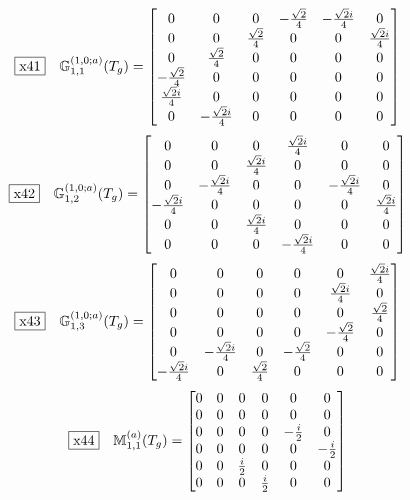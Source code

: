 \documentclass[fleqn,10pt,landscape]{jsarticle}
\begin{document}
\begin{dmath*}
\fbox{x41}\quad \mathbb{G}_{1,1}^{(1,0;a)}(T_{g})=\begin{bmatrix} 0 & 0 & 0 & - \frac{\sqrt{2}}{4} & - \frac{\sqrt{2} i}{4} & 0 \\ 0 & 0 & \frac{\sqrt{2}}{4} & 0 & 0 & \frac{\sqrt{2} i}{4} \\ 0 & \frac{\sqrt{2}}{4} & 0 & 0 & 0 & 0 \\ - \frac{\sqrt{2}}{4} & 0 & 0 & 0 & 0 & 0 \\ \frac{\sqrt{2} i}{4} & 0 & 0 & 0 & 0 & 0 \\ 0 & - \frac{\sqrt{2} i}{4} & 0 & 0 & 0 & 0 \end{bmatrix}
\end{dmath*}
\begin{dmath*}
\fbox{x42}\quad \mathbb{G}_{1,2}^{(1,0;a)}(T_{g})=\begin{bmatrix} 0 & 0 & 0 & \frac{\sqrt{2} i}{4} & 0 & 0 \\ 0 & 0 & \frac{\sqrt{2} i}{4} & 0 & 0 & 0 \\ 0 & - \frac{\sqrt{2} i}{4} & 0 & 0 & - \frac{\sqrt{2} i}{4} & 0 \\ - \frac{\sqrt{2} i}{4} & 0 & 0 & 0 & 0 & \frac{\sqrt{2} i}{4} \\ 0 & 0 & \frac{\sqrt{2} i}{4} & 0 & 0 & 0 \\ 0 & 0 & 0 & - \frac{\sqrt{2} i}{4} & 0 & 0 \end{bmatrix}
\end{dmath*}
\begin{dmath*}
\fbox{x43}\quad \mathbb{G}_{1,3}^{(1,0;a)}(T_{g})=\begin{bmatrix} 0 & 0 & 0 & 0 & 0 & \frac{\sqrt{2} i}{4} \\ 0 & 0 & 0 & 0 & \frac{\sqrt{2} i}{4} & 0 \\ 0 & 0 & 0 & 0 & 0 & \frac{\sqrt{2}}{4} \\ 0 & 0 & 0 & 0 & - \frac{\sqrt{2}}{4} & 0 \\ 0 & - \frac{\sqrt{2} i}{4} & 0 & - \frac{\sqrt{2}}{4} & 0 & 0 \\ - \frac{\sqrt{2} i}{4} & 0 & \frac{\sqrt{2}}{4} & 0 & 0 & 0 \end{bmatrix}
\end{dmath*}
\begin{dmath*}
\fbox{x44}\quad \mathbb{M}_{1,1}^{(a)}(T_{g})=\begin{bmatrix} 0 & 0 & 0 & 0 & 0 & 0 \\ 0 & 0 & 0 & 0 & 0 & 0 \\ 0 & 0 & 0 & 0 & - \frac{i}{2} & 0 \\ 0 & 0 & 0 & 0 & 0 & - \frac{i}{2} \\ 0 & 0 & \frac{i}{2} & 0 & 0 & 0 \\ 0 & 0 & 0 & \frac{i}{2} & 0 & 0 \end{bmatrix}
\end{dmath*}
\end{document}
